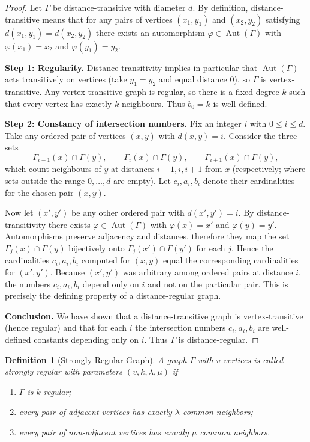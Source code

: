 \documentclass[12pt,a4paper,openany]{book}
\newtheorem{definition}{Definition}[section]
\begin{document}
\begin{proof}
Let $\Gamma$ be distance-transitive with diameter $d$. By definition,
distance-transitive means that for any pairs of vertices $(x_1,y_1)$ and
$(x_2,y_2)$ satisfying $d(x_1,y_1)=d(x_2,y_2)$ there exists an
automorphism $\varphi\in\operatorname{Aut}(\Gamma)$ with
$\varphi(x_1)=x_2$ and $\varphi(y_1)=y_2$.

\medskip\noindent\textbf{Step 1: Regularity.}
Distance-transitivity implies in particular that $\operatorname{Aut}(\Gamma)$
acts transitively on vertices (take $y_1=y_2$ and equal distance $0$),
so $\Gamma$ is vertex-transitive. Any vertex-transitive graph is regular,
so there is a fixed degree $k$ such that every vertex has exactly $k$
neighbours. Thus $b_0=k$ is well-defined.

\medskip\noindent\textbf{Step 2: Constancy of intersection numbers.}
Fix an integer $i$ with $0\le i\le d$. Take any ordered pair of vertices
$(x,y)$ with $d(x,y)=i$. Consider the three sets
\[
\Gamma_{i-1}(x)\cap\Gamma(y),\qquad
\Gamma_{i}(x)\cap\Gamma(y),\qquad
\Gamma_{i+1}(x)\cap\Gamma(y),
\]
which count neighbours of $y$ at distances $i-1,i,i+1$ from $x$
(respectively; where sets outside the range $0,\dots,d$ are empty).
Let $c_i,a_i,b_i$ denote their cardinalities for the chosen pair $(x,y)$.

Now let $(x',y')$ be any other ordered pair with $d(x',y')=i$. By
distance-transitivity there exists $\varphi\in\operatorname{Aut}(\Gamma)$
with $\varphi(x)=x'$ and $\varphi(y)=y'$. Automorphisms preserve
adjacency and distances, therefore they map the set
$\Gamma_{j}(x)\cap\Gamma(y)$ bijectively onto
$\Gamma_{j}(x')\cap\Gamma(y')$ for each $j$. Hence the cardinalities
$c_i,a_i,b_i$ computed for $(x,y)$ equal the corresponding cardinalities
for $(x',y')$. Because $(x',y')$ was arbitrary among ordered pairs at
distance $i$, the numbers $c_i,a_i,b_i$ depend only on $i$ and not on
the particular pair. This is precisely the defining property of a
distance-regular graph.

\medskip\noindent\textbf{Conclusion.}  
We have shown that a distance-transitive graph is vertex-transitive
(hence regular) and that for each $i$ the intersection numbers
$c_i,a_i,b_i$ are well-defined constants depending only on $i$. Thus
$\Gamma$ is distance-regular.
\end{proof}

\begin{definition}[Strongly Regular Graph]
A graph $\Gamma$ with $v$ vertices is called \emph{strongly regular} with parameters
$(v,k,\lambda,\mu)$ if
\begin{enumerate}
    \item $\Gamma$ is $k$-regular;
    \item every pair of adjacent vertices has exactly $\lambda$ common neighbors;
    \item every pair of non-adjacent vertices has exactly $\mu$ common neighbors.
\end{enumerate}
\end{definition}
\end{document}
